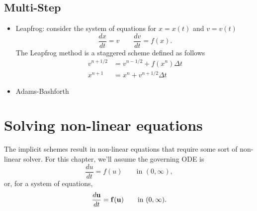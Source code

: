 \documentclass[oneside,a4paper,11pt]{report}
\begin{document}
\section{Multi-Step}
\begin{itemize}
\item Leapfrog: consider the system of equations for $x=x(t)$ and $v=v(t)$
\begin{equation}
    \frac{dx}{dt} = v \qquad \frac{dv}{dt} = f(x).
\end{equation}
The Leapfrog method is a staggered scheme defined as follows
\begin{align}
    v^{n+1/2} &= v^{n-1/2} + f(x^n) \Delta t \\
    x^{n+1} &= x^{n} + v^{n+1/2} \Delta t
\end{align}

\item Adams-Bashforth
\end{itemize}

\chapter{Solving non-linear equations}
The implicit schemes result in non-linear equations that require some sort of non-linear solver. For this chapter, we'll assume the governing ODE is
\begin{equation}
\label{eq:time_stepping_ode}
    \frac{du}{dt} = f(u) \qquad \text{in }(0,\infty),
\end{equation}
or, for a system of equations,
\begin{equation}
\label{eq:time_stepping_ode_system}
    \frac{d\mathbf{u}}{dt} = \mathbf{f}(\mathbf{u}) \qquad \text{in }(0,\infty).
\end{equation}

\end{document}
